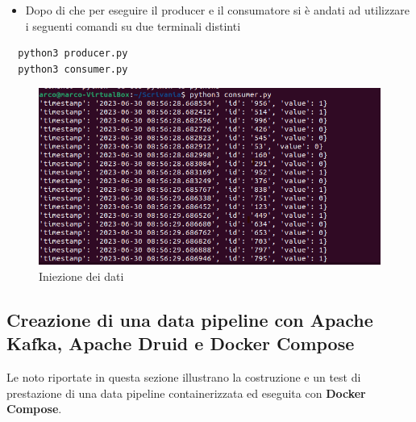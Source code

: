 \documentclass{article}
\begin{document}
\begin{itemize}
  \item Dopo di che per eseguire il producer e il consumatore si è andati ad utilizzare i seguenti comandi su due terminali distinti
\end{itemize}
\begin{lstlisting}
  python3 producer.py
  python3 consumer.py
\end{lstlisting}
\begin{figure}[H]
    \centering
    \includegraphics[scale=0.5]{images/consumer.png}
    \caption{Iniezione dei dati}
    \label{fig:my_label}
\end{figure} 
\subsection{Creazione di una data pipeline con Apache Kafka, Apache Druid e Docker Compose}
Le noto riportate in questa sezione illustrano la costruzione e un test di prestazione di una data pipeline containerizzata ed eseguita con \textbf{Docker Compose}.
\end{document}
